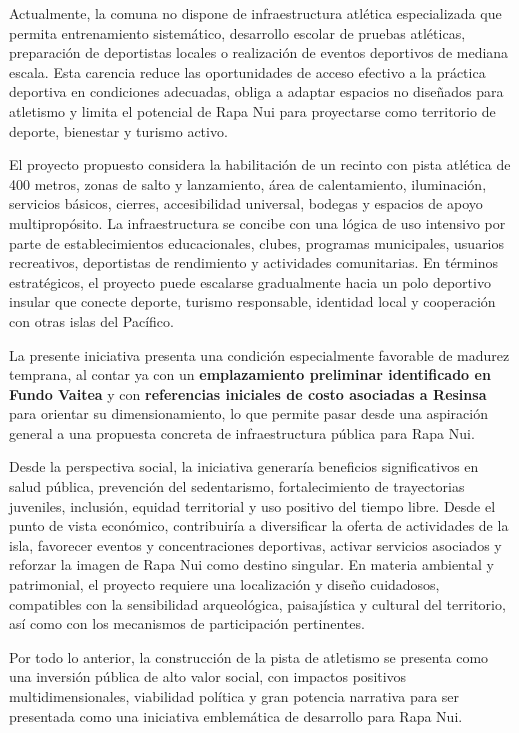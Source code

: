 \documentclass[12pt,letterpaper]{article}
\begin{document}
Actualmente, la comuna no dispone de infraestructura atlética especializada que permita entrenamiento sistemático, desarrollo escolar de pruebas atléticas, preparación de deportistas locales o realización de eventos deportivos de mediana escala. Esta carencia reduce las oportunidades de acceso efectivo a la práctica deportiva en condiciones adecuadas, obliga a adaptar espacios no diseñados para atletismo y limita el potencial de Rapa Nui para proyectarse como territorio de deporte, bienestar y turismo activo.

El proyecto propuesto considera la habilitación de un recinto con pista atlética de 400 metros, zonas de salto y lanzamiento, área de calentamiento, iluminación, servicios básicos, cierres, accesibilidad universal, bodegas y espacios de apoyo multipropósito. La infraestructura se concibe con una lógica de uso intensivo por parte de establecimientos educacionales, clubes, programas municipales, usuarios recreativos, deportistas de rendimiento y actividades comunitarias. En términos estratégicos, el proyecto puede escalarse gradualmente hacia un polo deportivo insular que conecte deporte, turismo responsable, identidad local y cooperación con otras islas del Pacífico.

La presente iniciativa presenta una condición especialmente favorable de madurez temprana, al contar ya con un \textbf{emplazamiento preliminar identificado en Fundo Vaitea} y con \textbf{referencias iniciales de costo asociadas a Resinsa} para orientar su dimensionamiento, lo que permite pasar desde una aspiración general a una propuesta concreta de infraestructura pública para Rapa Nui.

Desde la perspectiva social, la iniciativa generaría beneficios significativos en salud pública, prevención del sedentarismo, fortalecimiento de trayectorias juveniles, inclusión, equidad territorial y uso positivo del tiempo libre. Desde el punto de vista económico, contribuiría a diversificar la oferta de actividades de la isla, favorecer eventos y concentraciones deportivas, activar servicios asociados y reforzar la imagen de Rapa Nui como destino singular. En materia ambiental y patrimonial, el proyecto requiere una localización y diseño cuidadosos, compatibles con la sensibilidad arqueológica, paisajística y cultural del territorio, así como con los mecanismos de participación pertinentes.

Por todo lo anterior, la construcción de la pista de atletismo se presenta como una inversión pública de alto valor social, con impactos positivos multidimensionales, viabilidad política y gran potencia narrativa para ser presentada como una iniciativa emblemática de desarrollo para Rapa Nui.
\end{document}
